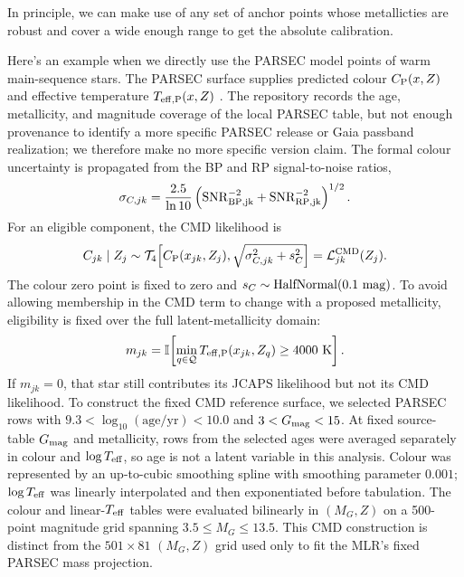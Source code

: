 In principle, we can make use of any set of anchor points whose metallicties are robust and cover a wide enough range to get the absolute calibration. 

Here's an example when we directly use the PARSEC model points of warm main-sequence stars.  The PARSEC surface supplies predicted colour $C_{\rm P}(x,Z)$ and effective temperature $T_{\rm eff,P}(x,Z)$ \citep{Bressan2012PARSEC}.  The repository
records the age, metallicity, and magnitude coverage of the local PARSEC table,
but not enough provenance to identify a more specific PARSEC release or Gaia
passband realization; we therefore make no more specific version claim.  The
formal colour uncertainty is propagated
from the BP and RP signal-to-noise ratios,
\begin{equation}
 \sigma_{C,jk}=\frac{2.5}{\ln 10}
 \left(\mathrm{SNR}_{\rm BP,jk}^{-2}
 +\mathrm{SNR}_{\rm RP,jk}^{-2}\right)^{1/2}.
\end{equation}
For an eligible component, the CMD likelihood is
\begin{equation}
 C_{jk} \mid Z_j \sim \mathcal{T}_{4}\!\left[
 C_{\rm P}(x_{jk},Z_j),
 \sqrt{\sigma_{C,jk}^2+s_C^2}\right] =  \mathcal{L}^{\rm CMD}_{jk}(Z_j).
 \label{eq:cmd}
\end{equation}
The colour zero point is fixed to zero and
$s_C\sim\operatorname{HalfNormal}(0.1\ {\rm mag})$.  To avoid allowing membership in the
CMD term to change with a proposed metallicity, eligibility is fixed over the
full latent-metallicity domain:
\begin{equation}
 m_{jk}=\mathbb{I}\!\left[
 \min_{q\in\mathcal Q}T_{\rm eff,P}(x_{jk},Z_q)\ge4000\ {\rm K}\right].
 \label{eq:warm-mask}
\end{equation}
If $m_{jk}=0$, that star still contributes its JCAPS likelihood but not its CMD
likelihood.  To construct the fixed CMD reference surface, we selected PARSEC
rows with $9.3<\log_{10}(\mathrm{age/yr})<10.0$ and
$3<G_{\rm mag}<15$.  At fixed source-table $G_{\rm mag}$ and metallicity, rows
from the selected ages were averaged separately in colour and
$\log T_{\rm eff}$, so age is not a latent variable in this analysis.  Colour
was represented by an up-to-cubic smoothing spline with smoothing parameter
$0.001$; $\log T_{\rm eff}$ was linearly interpolated and then exponentiated
before tabulation.  The colour and linear-$T_{\rm eff}$ tables were evaluated
bilinearly in $(M_G,Z)$ on a 500-point magnitude grid spanning
$3.5\le M_G\le13.5$.  This CMD construction is distinct from the
$501\times81$ $(M_G,Z)$ grid used only to fit the MLR's fixed PARSEC mass
projection.

